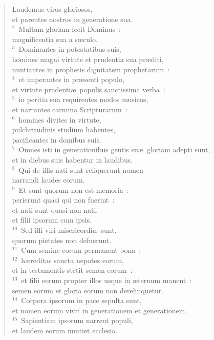 \begin{flushleft}\begin{verse}\vspace{-19pt}\hspace{6pt}Laudemus viros gloriosos,\\\hspace{6pt} et parentes nostros in generatione sua.\\
${}^{2}$~Multam gloriam fecit Dominus~:\\ magnificentia sua a s\ae culo.\\
${}^{3}$~Dominantes in potestatibus suis,\\ homines magni virtute et prudentia sua pr\ae diti,\\ nuntiantes in prophetis dignitatem prophetarum~:\\
${}^{4}$~et imperantes in pr\ae senti populo,\\ et virtute prudenti\ae\ populis sanctissima verba~:\\
${}^{5}$~in peritia sua requirentes modos musicos,\\ et narrantes carmina Scripturarum~:\\
${}^{6}$~homines divites in virtute,\\ pulchritudinis studium habentes,\\ pacificantes in domibus suis.\\
${}^{7}$~Omnes isti in generationibus gentis su\ae\ gloriam adepti sunt,\\ et in diebus suis habentur in laudibus.\\
${}^{8}$~Qui de illis nati sunt reliquerunt nomen\\ narrandi laudes eorum.\\
${}^{9}$~Et sunt quorum non est memoria~:\\ perierunt quasi qui non fuerint~:\\ et nati sunt quasi non nati,\\ et filii ipsorum cum ipsis.\\
${}^{10}$~Sed illi viri misericordi\ae\ sunt,\\ quorum pietates non defuerunt.\\
${}^{11}$~Cum semine eorum permanent bona~:\\
${}^{12}$~h\ae reditas sancta nepotes eorum,\\ et in testamentis stetit semen eorum~:\\
${}^{13}$~et filii eorum propter illos usque in \ae ternum manent~:\\ semen eorum et gloria eorum non derelinquetur.\\
${}^{14}$~Corpora ipsorum in pace sepulta sunt,\\ et nomen eorum vivit in generationem et generationem.\\
${}^{15}$~Sapientiam ipsorum narrent populi,\\ et laudem eorum nuntiet ecclesia.\end{verse}\end{flushleft}


